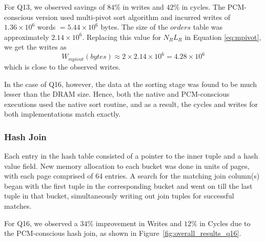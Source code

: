 \begin{comment}
The quicksort code from the GNU library was used for the conventional
version of sorting. On the other hand, the PCM-conscious version was
designed to employ a multi-pivot sort when the available DRAM was less
than the size of the data to be sorted; else, it reverted to the
native quicksort algorithm.
For Q13,  where the size of the ORDERS table is 216M, the write ratio
of native single-pivot quicksort to multi-pivot sort is estimated
by the bounds of Section~\ref{sort} to be within
$\displaystyle \frac{2}{2+ln\frac{N_R L_R}{|DRAM|} } \approx
\frac{2}{2+ln\frac {216M}{4M}  } \approx \frac{1}{3}$. These savings
are close to the $XX\%$ depicted by the ratio.
\end{comment}

\begin{comment}
the sort operator was the most heavily used and incurred
the majority of the writes and time. We observed a savings of about
70\% in writes and 20\% in running time. The size of orders table was
216M. 
\end{comment}
For Q13, we observed savings of $84\%$ in writes and $42\%$ in cycles. The PCM-conscious version used multi-pivot sort algorithm and incurred writes of $1.36 \times 10^6$ words $= 5.44 \times 10^6 $ bytes. The size of the $orders$ table was approximately $2.14 \times 10^6$. Replacing this value for $N_R L_R$ in Equation \ref{eq:mpivot}, we get the writes as $$W_{mpivot}(bytes) \approx 2 \times 2.14 \times 10^6  = 4.28 \times 10^6 $$ which is close to the observed writes.

In the case of Q16, however, the data at the sorting stage was found to be
much lesser than the DRAM size. Hence, both the native and PCM-conscious
executions used the native sort routine, and as a result, the cycles
and writes for both implementations match exactly.

\subsubsection{Hash Join}
Each entry in the hash table consisted of a pointer to the inner tuple
and a hash value field. New memory allocation to each bucket was done in
units of pages, with each page comprised of 64 entries. A search for the
matching join column(s) began with the first tuple in the corresponding
bucket and went on till the last tuple in that bucket, simultaneously
writing out join tuples for successful matches.

For Q16, we observed a $34\%$ improvement in Writes and $12\%$ in Cycles
due to the PCM-conscious hash join, as shown in Figure~\ref{fig:overall_results_q16}. 

